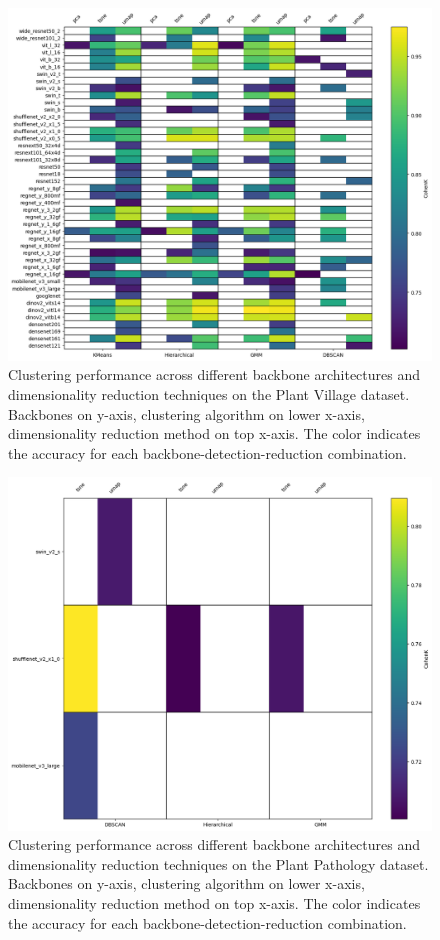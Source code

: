 \documentclass[12pt,a4paper,oneside]{report}
\begin{document}
\begin{figure}[H]
    \centering
    \includegraphics[width=17cm]{plots/clusterization_plantvillage}
    \caption{Clustering performance across different backbone architectures and dimensionality reduction techniques on the Plant Village dataset.
    Backbones on y-axis, clustering algorithm on lower x-axis, dimensionality reduction method on top x-axis.
    The color indicates the accuracy for each backbone-detection-reduction combination.}
    \label{fig:clusterization_plantvillage}
\end{figure}

\begin{figure}[H]
    \centering
    \includegraphics[width=17cm]{plots/clusterization_plantpathology}
    \caption{Clustering performance across different backbone architectures and dimensionality reduction techniques on the Plant Pathology dataset.
    Backbones on y-axis, clustering algorithm on lower x-axis, dimensionality reduction method on top x-axis.
    The color indicates the accuracy for each backbone-detection-reduction combination.}
    \label{fig:clusterization_plantpathology}
\end{figure}
\end{document}
